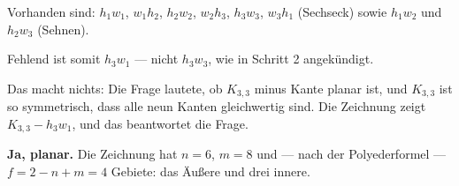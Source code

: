 \begin{aufgabe}
Vorhanden sind: $h_1w_1$, $w_1h_2$, $h_2w_2$, $w_2h_3$, $h_3w_3$, $w_3h_1$ (Sechseck) sowie $h_1w_2$ und $h_2w_3$ (Sehnen).

Fehlend ist somit $h_3w_1$ --- nicht $h_3w_3$, wie in Schritt 2 angekündigt.

Das macht nichts: Die Frage lautete, ob $K_{3,3}$ minus  Kante planar ist, und $K_{3,3}$ ist so symmetrisch, dass alle neun Kanten gleichwertig sind. Die Zeichnung zeigt $K_{3,3} - h_3w_1$, und das beantwortet die Frage.

\textbf{Ja, planar.} Die Zeichnung hat $n=6$, $m=8$ und --- nach der Polyederformel --- $f = 2 - n + m = 4$ Gebiete: das Äußere und drei innere.

\begin{center}
\begin{minipage}{0.86\textwidth}
\end{minipage}
\end{center}
\end{aufgabe}

